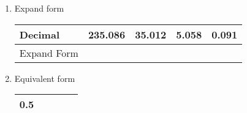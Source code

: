 \begin{enumerate}
    \item Expand form

    \begin{myTableStyle} \begin{tabular}{ |m{3cm}|m{2.5cm}|m{2.5cm}|m{2.5cm}|m{2.5cm}| } \hline
        Decimal &  235.086  & 35.012  & 5.058 & 0.091  \\ \hline
        Expand Form &  &  &  & \\ \hline
    \end{tabular} \end{myTableStyle} \vspace{0.08in}

    \item Equivalent form

    \begin{myTableStyle} \begin{tabular}{ |m{3cm}|m{2.5cm}|m{2.5cm}|m{2.5cm}|m{2.5cm}| } \hline
        0.5 &    &   &   &    \\ \hline
    \end{tabular} \end{myTableStyle} \vspace{0.08in}

\end{enumerate}
